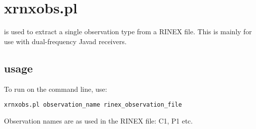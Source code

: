 \section{xrnxobs.pl \label{s:xrnxobs}}

 is used to extract a single observation type from a RINEX file.
This is mainly for use with dual-frequency Javad receivers.

\subsection{usage}
To run  on the command line, use:
\begin{lstlisting}[mathescape=true]
xrnxobs.pl observation_name rinex_observation_file
\end{lstlisting}
Observation names are as used in the RINEX file: C1, P1 etc.